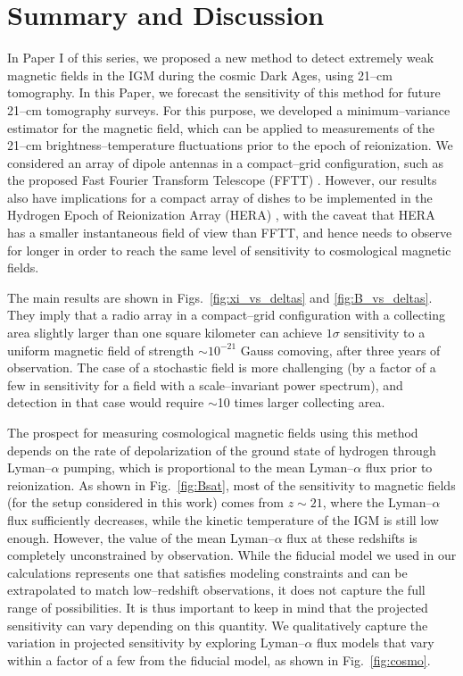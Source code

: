 \section{Summary and Discussion}
\label{sec:conclusions}

In Paper I of this series, we proposed a new method to detect extremely weak magnetic fields in the IGM during the cosmic Dark Ages, using 21--cm tomography. In this Paper, we forecast the sensitivity of this method for future 21--cm tomography surveys. For this purpose, we developed a minimum--variance estimator for the magnetic field, which can be applied to measurements of the 21--cm brightness--temperature fluctuations prior to the epoch of reionization. We considered an array of dipole antennas in a compact--grid configuration, such as the proposed Fast Fourier Transform Telescope (FFTT) \cite{2009PhRvD..79h3530T}. However, our results also have implications for a compact array of dishes to be implemented in the Hydrogen Epoch of Reionization Array (HERA) \cite{2015AAS...22532803D}, with the caveat that HERA has a smaller instantaneous field of view than FFTT, and hence needs to observe for longer in order to reach the same level of sensitivity to cosmological magnetic fields. 

The main results are shown in Figs.~\ref{fig:xi_vs_deltas} and \ref{fig:B_vs_deltas}. They imply that a radio array in a compact--grid configuration with a collecting area slightly larger than one square kilometer can achieve $1\sigma$ sensitivity to a uniform magnetic field of strength $\sim$$10^{-21}$ Gauss comoving, after three years of observation. The case of a stochastic field is more challenging (by a factor of a few in sensitivity for a field with a scale--invariant power spectrum), and detection in that case would require $\sim$10 times larger collecting area.

The prospect for measuring cosmological magnetic fields using this method depends on the rate of depolarization of the ground state of hydrogen through Lyman--$\alpha$ pumping, which is proportional to the mean Lyman--$\alpha$ flux prior to reionization. As shown in Fig.~\ref{fig:Bsat}, most of the sensitivity to magnetic fields (for the setup considered in this work) comes from $z\sim 21$, where the Lyman--$\alpha$ flux sufficiently decreases, while the kinetic temperature of the IGM is still low enough. However, the value of the mean Lyman--$\alpha$ flux at these redshifts is completely unconstrained by observation. While the fiducial model we used in our calculations represents one that satisfies modeling constraints and can be extrapolated to match low--redshift observations, it does not capture the full range of possibilities. It is thus important to keep in mind that the projected sensitivity can vary depending on this quantity. We qualitatively capture the variation in projected sensitivity by exploring Lyman--$\alpha$ flux models that vary within a factor of a few from the fiducial model, as shown in Fig.~\ref{fig:cosmo}.

